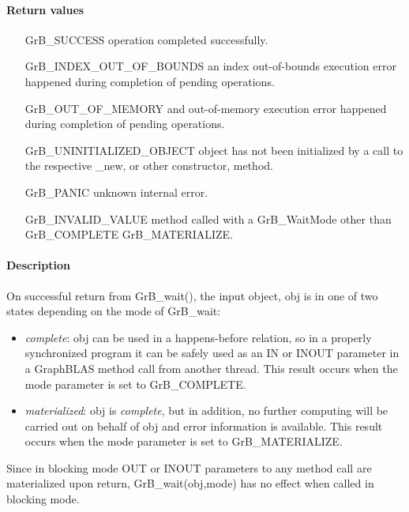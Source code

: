 \paragraph{Return values}
\begin{itemize}[leftmargin=2.3in]
	\item[{\sf GrB\_SUCCESS}]			operation completed successfully.
	\item[{\sf GrB\_INDEX\_OUT\_OF\_BOUNDS}]	an index out-of-bounds execution error happened during completion of pending operations.
	\item[{\sf GrB\_OUT\_OF\_MEMORY}]		and out-of-memory execution error happened during completion of pending operations.
	\item[{\sf GrB\_UNINITIALIZED\_OBJECT}]		object has not been initialized by a call to the respective {\sf *\_new}, or other constructor, method.
	\item[{\sf GrB\_PANIC}]				unknown internal error.
	\item[{\sf GrB\_INVALID\_VALUE}]				method called with a {\sf GrB\_WaitMode} other than {\sf GrB\_COMPLETE} {\sf GrB\_MATERIALIZE}.
\end{itemize}

\paragraph{Description}

On successful return from {\sf GrB\_wait()}, the input object, {\sf obj} is in one of two states depending on the mode of {\sf GrB\_wait}: 
\begin{itemize}
\item \emph{complete}:  {\sf obj} can be used in a happens-before relation, so in a properly synchronized
program it can be safely used as an {\sf IN} or {\sf INOUT} parameter in a
GraphBLAS method call from another thread.  This result occurs when the mode parameter is set to {\sf GrB\_COMPLETE}.

\item \emph{materialized}:  {\sf obj} is \emph{complete}, but in addition, no further computing will be 
carried out on behalf of {\sf obj} and error information is available.   This result
occurs when the mode parameter is set to {\sf GrB\_MATERIALIZE}. %
\end{itemize} 
Since in blocking mode {\sf OUT} or {\sf INOUT} parameters to any method call
are materialized upon return, {\sf GrB\_wait(obj,mode)} has no effect when called in blocking mode. 

